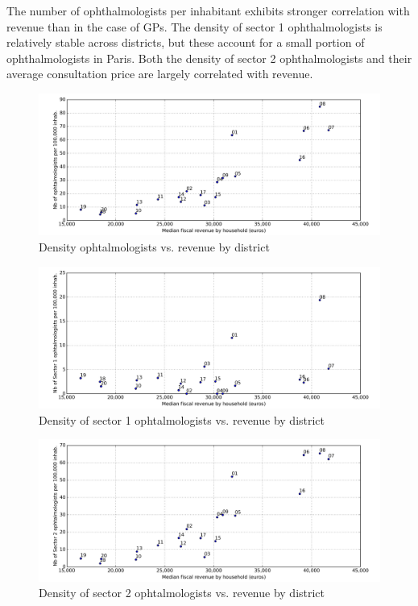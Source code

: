 \documentclass[11pt]{article}
\begin{document}
The number of ophthalmologists per inhabitant exhibits stronger correlation with revenue than in the case of GPs. The density of sector 1 ophthalmologists is relatively stable across districts, but these account for a small portion of ophthalmologists in Paris. Both the density of sector 2 ophthalmologists and their average consultation price are largely correlated with revenue.

\begin{figure}[H]
    \caption{Density ophtalmologists vs. revenue by district}
	\centering
		\includegraphics[width=16cm]{images/Ophtalmo_Ardt_DensityVsRevenue.png}
\end{figure}

\begin{figure}[H]
    \caption{Density of sector 1 ophtalmologists vs. revenue by district}
	\centering
		\includegraphics[width=16cm]{images/Ophtalmo_Ardt_DensityS1VsRevenue.png}
\end{figure}


\begin{figure}[H]
    \caption{Density of sector 2 ophtalmologists vs. revenue by district}
	\centering
		\includegraphics[width=16cm]{images/Ophtalmo_Ardt_DensityS2VsRevenue.png}
\end{figure}
\end{document}
